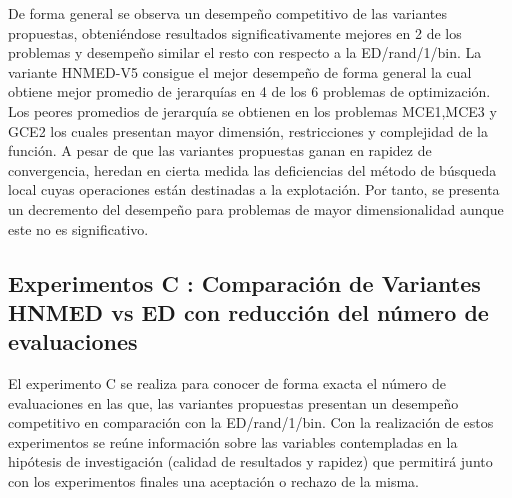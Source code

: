 De forma general se observa un desempeño competitivo de las variantes propuestas, obteniéndose resultados significativamente mejores en 2 de los problemas y desempeño similar el resto con respecto a la ED/rand/1/bin. La variante HNMED-V5 consigue el mejor desempeño de forma general la cual obtiene mejor promedio de jerarquías en 4 de los 6 problemas de optimización. Los peores promedios de jerarquía se obtienen en los problemas MCE1,MCE3 y GCE2 los cuales presentan mayor dimensión, restricciones y complejidad de la función. A pesar de que las variantes propuestas ganan en rapidez de convergencia, heredan en cierta medida las deficiencias del método de búsqueda local cuyas operaciones están destinadas a la explotación. Por tanto, se presenta un decremento del desempeño para problemas de mayor dimensionalidad aunque este no es significativo.








\subsection{Experimentos C : Comparación de Variantes HNMED vs ED con reducción del número de evaluaciones}
El experimento C se realiza para conocer de forma exacta el número de evaluaciones en las que, las variantes propuestas presentan un desempeño competitivo en comparación con la ED/rand/1/bin. Con la realización de estos experimentos se reúne información sobre las variables contempladas en la hipótesis de investigación (calidad de resultados y rapidez) que permitirá junto con los experimentos finales una aceptación o rechazo de la misma.  

